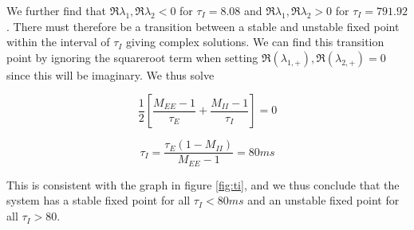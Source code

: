 \documentclass{article}
\begin{document}
We further find that $\Re{\lambda_1}, \Re{\lambda_2} < 0$ for $\tau_I = 8.08$ and $\Re{\lambda_1}, \Re{\lambda_2} > 0$ for $\tau_I = 791.92$. There must therefore be a transition between a stable and unstable fixed point within the interval of $\tau_I$ giving complex solutions. We can find this transition point by ignoring the squareroot term when setting $\Re{(\lambda_{1,+})}, \Re{(\lambda_{2,+} )}= 0$ since this will be imaginary. We thus solve

\begin{equation}
 \dfrac{1}{2}[\dfrac{M_{EE}-1}{\tau_E}+\dfrac{M_{II}-1}{\tau_I} ] = 0
\end{equation}

\begin{equation}
\tau_I = \dfrac{\tau_E(1-M_{II})}{M_{EE}-1} = 80 ms
\end{equation}

This is consistent with the graph in figure \ref{fig:ti}, and we thus conclude that the system has a stable fixed point for all $\tau_I < 80 ms$ and an unstable fixed point for all $\tau_I > 80$.
\end{document}

